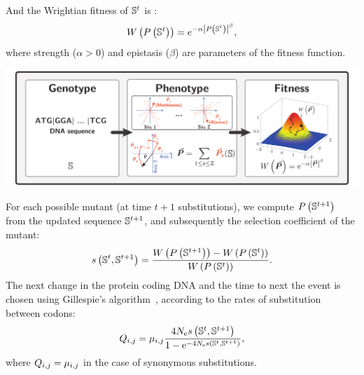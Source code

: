 \documentclass{article}
\begin{document}
	And the Wrightian fitness of $\mathbb{S}^t$ is :
	\begin{equation}
		W\left( P\left(\mathbb{S}^{t}\right) \right) = e^{-\alpha \left| P\left(\mathbb{S}^{t}\right) \right|^{\beta}},
	\end{equation}
	where strength ($\alpha > 0$) and epistasis ($\beta$) are parameters of the fitness function.
	\begin{center}
		\includegraphics[width=\textwidth] {ModelSimuGeo}
	\end{center}
	For each possible mutant (at time $t+1$ substitutions), we compute $P\left(\mathbb{S}^{t+1}\right)$ from the updated sequence $\mathbb{S}^{t+1}$, and subsequently the selection coefficient of the mutant:
	\begin{equation}
		s \left( \mathbb{S}^{t},\mathbb{S}^{t+1}\right) = \dfrac{W\left( P\left(\mathbb{S}^{t+1}\right) \right) -W\left( P\left(\mathbb{S}^{t}\right) \right)}{W\left( P\left(\mathbb{S}^{t}\right) \right)}.
	\end{equation}
	The next change in the protein coding {DNA} and the time to next the event is chosen using Gillespie's algorithm~\citep{Gillespie1977}, according to the rates of {substitution} between codons:
	\begin{equation}
	{Q_{{i}, {j}}}
		= \mu_{{i}, {j}} \dfrac{4 N_{\text{e}} s \left( \mathbb{S}^{t},\mathbb{S}^{t+1}\right)}{{1 - \text{e}^{-4 N_{\text{e}} s \left( \mathbb{S}^{t},\mathbb{S}^{t+1}\right)} }},
	\end{equation}
	where ${Q_{{i}, {j}}} = \mu_{{i}, {j}}$ in the case of {synonymous} substitutions.
\end{document}
